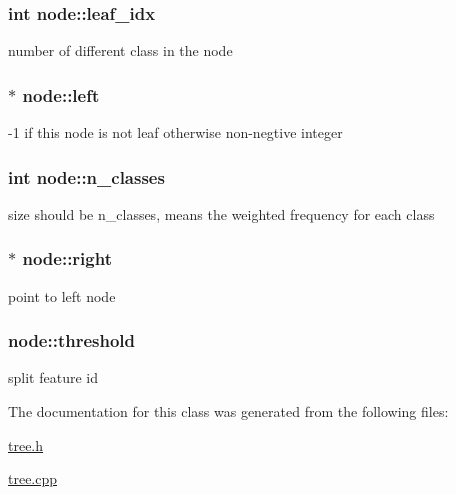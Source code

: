 \hypertarget{classnode_abbd7d4174869fead5f901b042a2f9712}{
\subsubsection[{leaf\+\_\+idx}]{\setlength{\rightskip}{0pt plus 5cm}int node\+::leaf\+\_\+idx}}\label{classnode_abbd7d4174869fead5f901b042a2f9712}
number of different class in the node \hypertarget{classnode_a7cbff55ff448f557223f79299056e9b1}{
\subsubsection[{left}]{$\ast$ node\+::left}}\label{classnode_a7cbff55ff448f557223f79299056e9b1}
-\/1 if this node is not leaf otherwise non-\/negtive integer \hypertarget{classnode_a8c4864582cb3fe15e84e7908d0965150}{
\subsubsection[{n\+\_\+classes}]{\setlength{\rightskip}{0pt plus 5cm}int node\+::n\+\_\+classes}}\label{classnode_a8c4864582cb3fe15e84e7908d0965150}
size should be {\ttfamily n\+\_\+classes}, means the weighted frequency for each class \hypertarget{classnode_abdc86d4c8604c481752953af3235fc47}{
\subsubsection[{right}]{$\ast$ node\+::right}}\label{classnode_abdc86d4c8604c481752953af3235fc47}
point to left node \hypertarget{classnode_a3774a77cb58d1554f63f34cbcb737a0c}{
\subsubsection[{threshold}]{ node\+::threshold}}\label{classnode_a3774a77cb58d1554f63f34cbcb737a0c}
split feature id 

The documentation for this class was generated from the following files\+:\begin{DoxyCompactItemize}
\item 
\hyperlink{tree_8h}{tree.\+h}\item 
\hyperlink{tree_8cpp}{tree.\+cpp}\end{DoxyCompactItemize}
